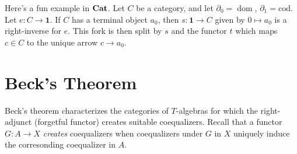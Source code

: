 Here's a fun example in $\mathbf{Cat} $. Let $C$ be a category, and let $\partial _0=\operatorname{dom} $, $\partial _1=\mathrm{cod} $. Let $e : C \to \mathbf{1} $. If $C$ has a terminal object $a_0$, then $s : \mathbf{1}  \to C$ given by $0\mapsto a_0$ is a right-inverse for $e$. This fork is then split by $s$ and the functor $t$ which maps $c\in C$ to the unique arrow $c\to a_0$.

\section{Beck's Theorem}

Beck's theorem characterizes the categories of $T$-algebras for which the right-adjunct (forgetful functor) creates suitable coequalizers. Recall that a functor $G : A \to X$ \emph{creates} coequalizers when coequalizers under $G$ in $X$ uniquely induce the corresonding coequalizer in $A$.

